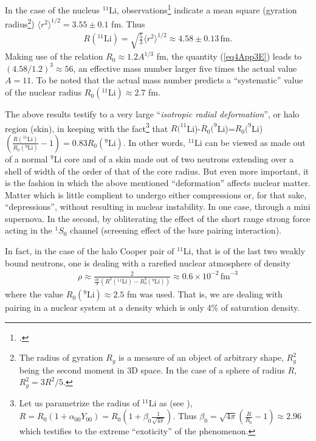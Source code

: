 In the case of the nucleus $^{11}$Li, observations\footnote{\cite{Kobayashi:89}.} indicate a mean square (gyration radius\footnote{The radius of gyration $R_g$ is a measure of an object of arbitrary shape, $R^2_g$ being the second moment in 3D space. In the case of a sphere of radius $R$, $R^2_g=3R^2/5$.}) $\langle r^2\rangle^{1/2}=3.55\pm 0.1$ fm. Thus
\begin{align}\label{eq4App3E}
R(^{11}\text{Li})=\sqrt{\frac{5}{3}}\langle r^2\rangle^{1/2}\approx 4.58\pm 0.13\,\text{fm}.
\end{align}
Making use of the relation $R_0\approx1.2 A^{1/3}$ fm, the quantity (\ref{eq4App3E}) leads to $(4.58/1.2)^3\approx56$, an effective mass number larger five times the actual value $A=11$. To be noted that the actual mass number predicts a ``systematic'' value of the nuclear radius $R_0(^{11}\text{Li})\approx 2.7$ fm.


The above results testify to a very large ``\emph{isotropic radial deformation}'', or halo region (skin), in keeping with the fact\footnote{\label{f155C4} Let us  parametrize the radius of $^{11}$Li as (see \cite{Bohr:75}), $R=R_0(1+\alpha_{00}Y_{00})=R_0(1+\beta_{0}\frac{1}{\sqrt{4\pi}})$. Thus $\beta_0=\sqrt{4\pi}(\frac{R}{R_0}-1)\approx 2.96$ which testifies to the extreme ``exoticity'' of the phenomenon.} that $R(^{11}$Li)-$R_0(^{9}$Li)=$R_0(^{9}$Li)$(\frac{R(^{11}\text{Li})}{R_0(^9\text{Li})}-1)=0.83R_0(^9\text{Li})$. In other words, $^{11}$Li can be viewed as made out of a normal $^{9}$Li core and of a skin made out of two neutrons   extending over a shell of width of the order of that of the core radius. But even more important, it is the fashion in which the above mentioned ``deformation'' affects nuclear matter. Matter  which is little complient to undergo either compressions or, for that sake, ``depressions'', without resulting in nuclear instability. In one case, through a mini supernova. In the second, by obliterating the effect of the short range strong force acting in the $^1S_0$ channel (screening effect of the bare pairing interaction).


In fact, in the case of the halo Cooper pair of $^{11}$Li, that is of the last two weakly bound neutrons, one is dealing with a rarefied nuclear atmosphere of density
\begin{align}\label{eq5App3E}
\rho\approx\frac{2}{\frac{4\pi}{3}(R^3(^{11}\text{Li})-R_0^3(^{9}\text{Li}))}\approx 0.6\times 10^{-2}\,\text{fm}^{-3}
\end{align}
where the value $R_0(^9\text{Li})\approx 2.5$ fm was used. That is, we are dealing with pairing in a nuclear system at a density which is only 4\% of saturation density.

